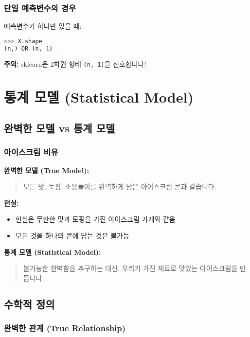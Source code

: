 \documentclass[12pt,a4paper]{article}
\begin{document}
\subsubsection{단일 예측변수의 경우}

예측변수가 하나만 있을 때:

\begin{lstlisting}[language=Python]
>>> X.shape
(n,) OR (n, 1)
\end{lstlisting}

\textbf{주의:} sklearn은 2차원 형태 \texttt{(n, 1)}을 선호합니다!

\section{통계 모델 (Statistical Model)}

\subsection{완벽한 모델 vs 통계 모델}

\subsubsection{아이스크림 비유}

\textbf{완벽한 모델 (True Model):}
\begin{quote}
모든 맛, 토핑, 소용돌이를 완벽하게 담은 아이스크림 콘과 같습니다.
\end{quote}

\textbf{현실:}
\begin{itemize}
    \item 현실은 무한한 맛과 토핑을 가진 아이스크림 가게와 같음
    \item 모든 것을 하나의 콘에 담는 것은 불가능
\end{itemize}

\textbf{통계 모델 (Statistical Model):}
\begin{quote}
불가능한 완벽함을 추구하는 대신, 우리가 가진 재료로 맛있는 아이스크림을 만듭니다.
\end{quote}

\subsection{수학적 정의}

\subsubsection{완벽한 관계 (True Relationship)}
\end{document}
